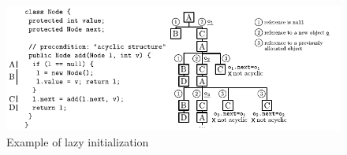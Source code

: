 \begin{figure}[t]
  \centering
  \includegraphics[width=0.9\columnwidth]{images/lazy-initialization} 
  \caption{Example of lazy initialization}
  \label{fig:example-lazy-initialization}
\end{figure}

